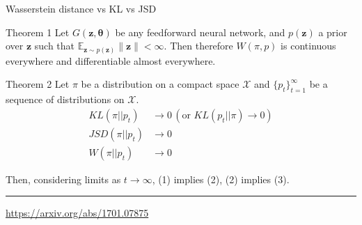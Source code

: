 \documentclass{beamer}
\newcommand{\bz}{\mathbf{z}}
\newcommand{\bbE}{\mathbb{E}}
\newcommand{\cX}{\mathcal{X}}
\newcommand{\btheta}{\boldsymbol{\theta}}
\begin{document}
\begin{frame}{Wasserstein distance vs KL vs JSD}
	\begin{block}{Theorem 1}
		Let $G(\bz, \btheta)$ be any feedforward neural network, and $p(\bz)$ a prior over $\bz$ such that $\bbE_{\bz \sim p(\bz)}
		\|\bz\| < \infty$. Then therefore $W(\pi, p)$ is continuous everywhere and differentiable almost everywhere.
	\end{block}
	\begin{block}{Theorem 2}
		Let $\pi$ be a distribution on a compact space $\cX$ and $\{p_t\}_{t=1}^\infty$ be a sequence of distributions on $\cX$. 
		\begin{align}
			KL(\pi || p_t) &\rightarrow 0 \, (\text{or }KL (p_t || \pi) \rightarrow 0) \\
			JSD(\pi || p_t) &\rightarrow 0 \\
			W(\pi || p_t) &\rightarrow 0
		\end{align}
		
		Then, considering limits as $t \rightarrow \infty$, (1) implies (2), (2) implies (3).
	\end{block}
	\vfill
	\hrule\medskip 
	{\scriptsize \href{https://arxiv.org/abs/1701.07875}{https://arxiv.org/abs/1701.07875}}
\end{frame}
\end{document}
